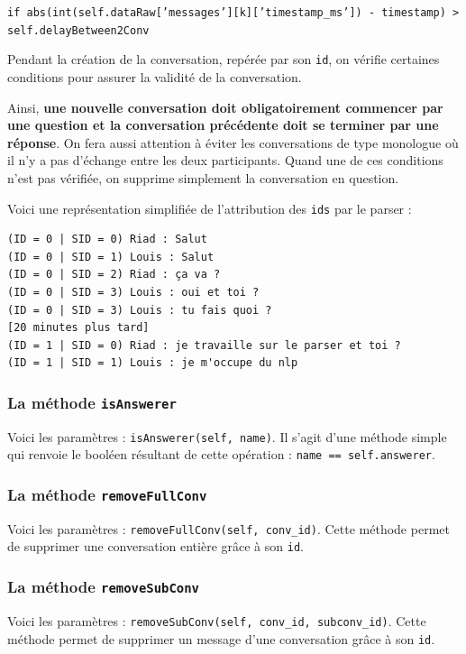\documentclass[10pt,a4paper]{article}
\begin{document}
\begin{center}
	\texttt{if abs(int(self.dataRaw['messages'][k]['timestamp\_ms']) - timestamp) > self.delayBetween2Conv}
\end{center}

Pendant la création de la conversation, repérée par son \texttt{id}, on vérifie certaines conditions pour assurer la validité de la conversation.

Ainsi, \textbf{une nouvelle conversation doit obligatoirement commencer par une question et la conversation précédente doit se terminer par une réponse}. On fera aussi attention à éviter les conversations de type monologue où il n'y a pas d'échange entre les deux participants. Quand une de ces conditions n'est pas vérifiée, on supprime simplement la conversation en question.

Voici une représentation simplifiée de l'attribution des \texttt{ids} par le parser :

\begin{verbatim}
(ID = 0 | SID = 0) Riad : Salut
(ID = 0 | SID = 1) Louis : Salut
(ID = 0 | SID = 2) Riad : ça va ?
(ID = 0 | SID = 3) Louis : oui et toi ?
(ID = 0 | SID = 3) Louis : tu fais quoi ?
[20 minutes plus tard]
(ID = 1 | SID = 0) Riad : je travaille sur le parser et toi ?
(ID = 1 | SID = 1) Louis : je m'occupe du nlp
\end{verbatim}

\subsubsection{La méthode \texttt{isAnswerer}}
Voici les paramètres : \texttt{isAnswerer(self, name)}. Il s'agit d'une méthode simple qui renvoie le booléen résultant de cette opération : \texttt{name == self.answerer}.

\subsubsection{La méthode \texttt{removeFullConv}}
Voici les paramètres : \texttt{removeFullConv(self, conv\_id)}. Cette méthode permet de supprimer une conversation entière grâce à son \texttt{id}.

\subsubsection{La méthode \texttt{removeSubConv}}
Voici les paramètres : \texttt{removeSubConv(self, conv\_id, subconv\_id)}. Cette méthode permet de supprimer un message d'une conversation grâce à son \texttt{id}.
\end{document}
